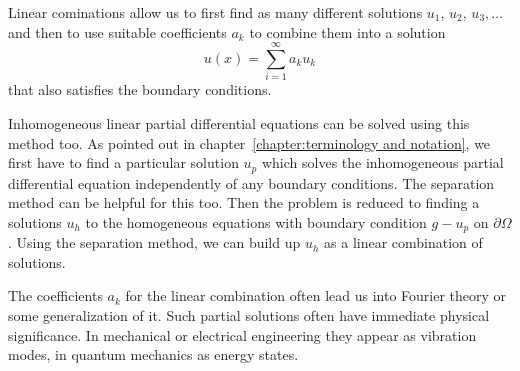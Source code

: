 Linear cominations allow us to first find as many different solutions
$u_1$, $u_2$, $u_3,\dots$ and then to use suitable coefficients $a_k$
to combine them into a solution
\[
u(x)=\sum_{i=1}^\infty a_ku_k
\]
that also satisfies the boundary conditions.

Inhomogeneous linear partial differential equations can be solved using
this method too.
As pointed out in chapter~\ref{chapter:terminology and notation},
we first have to find a particular solution $u_p$ which solves the
inhomogeneous partial differential equation independently
of any boundary conditions.
The separation method can be helpful for this too.
Then the problem is reduced to finding a solutions $u_h$ to the homogeneous
equations with boundary condition $g-u_p$ on $\partial\Omega$.
Using the separation method, we can build up $u_h$ as a linear combination
of solutions.

The coefficients $a_k$ for the linear combination often lead us into
Fourier theory or some generalization of it.
Such partial solutions often have immediate physical significance.
In mechanical or electrical engineering they appear as vibration modes,
in quantum mechanics as energy states.


